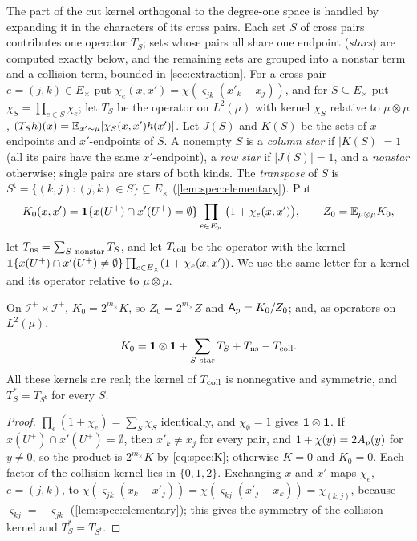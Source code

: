 The part of the cut kernel orthogonal to the degree-one space is
handled by expanding it in the characters of its cross pairs.
Each set $S$ of cross pairs contributes one operator $T_S$; sets
whose pairs all share one endpoint (\emph{stars}) are computed
exactly below, and the remaining sets are grouped into a nonstar
term and a collision term, bounded in \cref{sec:extraction}. For a
cross pair $e=(j,k)\in E_\times$ put $\chi_e(x,x')=\chi(\varsigma_{jk}(x'_k-x_j))$, and
for $S\subseteq E_\times$ put $\chi_S=\prod_{e\in S}\chi_e$; let $T_S$ be the operator on
$L^2(\mu)$ with kernel $\chi_S$ relative to $\mu\otimes\mu$,
$(T_Sh)(x)=\mathbb E_{x'\sim\mu}[\chi_S(x,x')h(x')]$. Let $J(S)$ and $K(S)$ be the sets of
$x$-endpoints and $x'$-endpoints of $S$. A nonempty $S$ is a \emph{column star} if
$|K(S)|=1$ (all its pairs have the same $x'$-endpoint), a \emph{row star} if
$|J(S)|=1$, and a \emph{nonstar} otherwise; single pairs are stars of both kinds.
The \emph{transpose} of $S$ is $S^{\mathsf t}=\{(k,j):(j,k)\in S\}\subseteq E_\times$
(\cref{lem:spec:elementary}). Put
\[
  K_0(x,x')=\mathbf 1\{x(U^+)\cap x'(U^+)=\emptyset\}\prod_{e\in E_\times}\big(1+\chi_e(x,x')\big),
  \qquad Z_0=\mathbb E_{\mu\otimes\mu}K_0,
\]
let $T_{\rm ns}=\sum_{S\ \rm nonstar}T_S$, and let $T_{\rm coll}$ be the operator with the
kernel $\mathbf 1\{x(U^+)\cap x'(U^+)\ne\emptyset\}\prod_{e\in E_\times}(1+\chi_e(x,x'))$. We use
the same letter for a kernel and its operator relative to $\mu\otimes\mu$.

\begin{lemma}[Expansion]\label{lem:spec:expansion}
On $\mathcal I^+\times\mathcal I^+$, $K_0=2^{m_\times}K$, so $Z_0=2^{m_\times}Z$ and $\mathsf A_p=K_0/Z_0$;
and, as operators on $L^2(\mu)$,
\begin{equation}\label{eq:record:root-kernel}
  K_0=\mathbf 1\otimes\mathbf 1+\sum_{S\ \rm star}T_S+T_{\rm ns}-T_{\rm coll}.
\end{equation}
All these kernels are real; the kernel of $T_{\rm coll}$ is nonnegative and symmetric,
and $T_S^*=T_{S^{\mathsf t}}$ for every $S$.
\end{lemma}

\begin{proof}
$\prod_e(1+\chi_e)=\sum_S\chi_S$ identically, and $\chi_\emptyset=1$ gives $\mathbf 1\otimes\mathbf 1$. If
$x(U^+)\cap x'(U^+)=\emptyset$, then $x'_k\ne x_j$ for every pair, and $1+\chi(y)=2A_{p}(y)$
for $y\ne0$, so the product is $2^{m_\times}K$ by \eqref{eq:spec:K}; otherwise $K=0$
and $K_0=0$. Each factor of the collision kernel lies in $\{0,1,2\}$. Exchanging
$x$ and $x'$ maps $\chi_e$, $e=(j,k)$, to
$\chi(\varsigma_{jk}(x_k-x'_j))=\chi(\varsigma_{kj}(x'_j-x_k))=\chi_{(k,j)}$, because
$\varsigma_{kj}=-\varsigma_{jk}$ (\cref{lem:spec:elementary}); this gives the symmetry of
the collision kernel and $T_S^*=T_{S^{\mathsf t}}$.
\end{proof}


